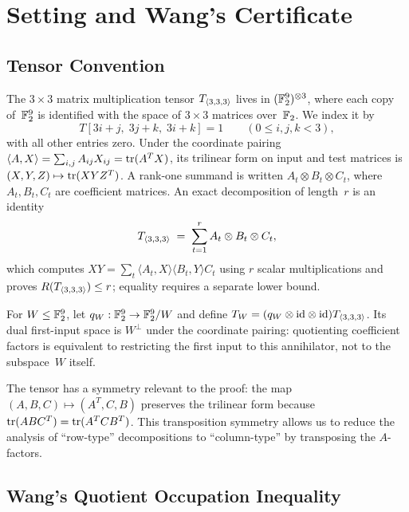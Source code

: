 \documentclass[11pt,a4paper]{article}
\begin{document}


\section{Setting and Wang's Certificate}\label{sec:setting}

\subsection{Tensor Convention}

The $3\times 3$ matrix multiplication tensor $T_{\langle3,3,3\rangle}$ lives in $(\mathbb{F}_2^9)^{\otimes 3}$, where each copy of~$\mathbb{F}_2^9$ is identified with the space of $3\times 3$ matrices over~$\mathbb{F}_2$.  We index it by
\begin{equation}\label{eq:tensor}
  T[3i+j,\;3j+k,\;3i+k] = 1 \qquad (0\le i,j,k<3),
\end{equation}
with all other entries zero. Under the coordinate pairing
$\langle A,X\rangle=\sum_{i,j}A_{ij}X_{ij}=\operatorname{tr}(A^TX)$, its trilinear
form on input and test matrices is $(X,Y,Z)\mapsto\operatorname{tr}(XYZ^T)$.
A rank-one summand is written $A_t\otimes B_t\otimes C_t$, where
$A_t,B_t,C_t$ are coefficient matrices. An exact decomposition of length~$r$ is an identity
\begin{equation}\label{eq:general-decomposition}
  T_{\langle3,3,3\rangle} \;=\; \sum_{t=1}^r A_t\otimes B_t\otimes C_t,
\end{equation}
which computes $XY=\sum_t\langle A_t,X\rangle\langle B_t,Y\rangle C_t$
using $r$ scalar multiplications and proves $R(T_{\langle3,3,3\rangle})\le r$; equality
requires a separate lower bound.

For $W\le\mathbb{F}_2^9$, let $q_W:\mathbb{F}_2^9\to\mathbb{F}_2^9/W$ and define
$T_W=(q_W\otimes\mathrm{id}\otimes\mathrm{id})T_{\langle3,3,3\rangle}$.
Its dual first-input space is $W^\perp$ under the coordinate pairing:
quotienting coefficient factors is equivalent to restricting the first
input to this annihilator, not to the subspace~$W$ itself.

The tensor has a symmetry relevant to the proof: the map $(A,B,C)\mapsto(A^T,C,B)$ preserves the trilinear form because $\operatorname{tr}(ABC^T)=\operatorname{tr}(A^TCB^T)$.  This transposition symmetry allows us to reduce the analysis of ``row-type'' decompositions to ``column-type'' by transposing the $A$-factors.

\subsection{Wang's Quotient Occupation Inequality}
\end{document}
